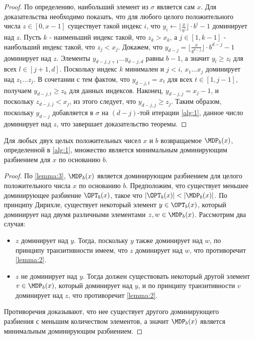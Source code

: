 \begin{proof}
	По определению, наибольший элемент из $\sigma$ является сам $x$.
	Для доказательства необходимо показать, что для любого целого положительного числа $z \in [0, x - 1]$ существует такой индекс $i$, что $y_i \leftarrow \lfloor \frac{x}{b^i} \rfloor \cdot b^i - 1$ доминирует над $z$.
	Пусть $k$ - наименьший индекс такой, что $z_k > x_k$, а $j \in [1, k - 1]$ - наибольший индекс такой, что $z_j < x_j$.
	Докажем, что $y_{d - j} = \lfloor \frac{x}{b^{d - j}} \rfloor \cdot b^{d - j} - 1$ доминирует над $z$.
	Элементы $y_{d - j, j + 1} \dots y_{d - j, d}$ равны $b - 1$, а значит $y_l \geq z_l$ для всех $l \in [j + 1, d]$.
	Поскольку индекс $k$ минимален и $j < i$, $x_1 \dots x_j$ доминирует над $z_1 \dots z_j$.
	В сочетании с тем фактом, что $y_{d - j, t} = x_t$ для всех $t \in [1, j - 1]$, получаем $y_{d - j, t} \geq z_k$ для данных индексов.
	Наконец, $y_{d - j, j} = x_j - 1$, и поскольку $z_{d - j, j} < x_j$, из этого следует, что $y_{d - j, j} \geq z_j$.
	Таким образом, поскольку $y_{d - j}$ добавляется в $\sigma$ на $(d - j)$-той итерации \ref{alg:1}, данное число доминирует над $z$, что завершает доказательство теоремы.
\end{proof}

\begin{theorem}
	\label{theorem:1}
	Для любых двух целых положительных чисел $x$ и $b$ возвращаемое $\MDP_b(x)$, определенной в \ref{alg:1}, множество является минимальным доминирующим разбиением для $x$ по основанию $b$.
\end{theorem}

\begin{proof}
	 По \ref{lemma:3}, $\MDP_b(x)$ является доминирующим разбиением для целого положительного числа $x$ по основанию $b$.
	Предположим, что существует меньшее доминирующее разбиение $\OPT_b(x)$, такое что $|\OPT_b(x)| < |\MDP_b(x)|$.
	По принципу Дирихле, существует некоторый элемент $y \in \OPT_b(x)$, который доминирует над двумя различными элементами $z, w \in \MDP_b(x)$.
	Рассмотрим два случая:
	\begin{itemize}
		\item $z$ доминирует над $y$. Тогда, поскольку $y$ также доминирует над $w$, по принципу транзитивности имеем, что $z$ доминирует над $w$, что противоречит \ref{lemma:2}.
		\item $z$ не доминирует над $y$. Тогда должен существовать некоторый другой элемент $v \in \MDP_b(x)$, который доминирует над $y$, и по принципу транзитивности $v$ доминирует над $z$, что противоречит \ref{lemma:2}.
	\end{itemize}
	Противоречия доказывают, что нее существует другого доминирующего разбиения с меньшим количеством элементов, а значит $\MDP_b(x)$ является минимальным доминирующим разбиением.
\end{proof}

